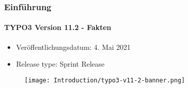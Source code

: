 %

\begin{frame}[fragile]
	\frametitle{Einführung}
	\framesubtitle{TYPO3 Version 11.2 - Fakten}

	\begin{itemize}
		\item Veröffentlichungsdatum: 4. Mai 2021
		\item Release type: Sprint Release
	\end{itemize}

	\begin{figure}
		\texttt{[image: Introduction/typo3-v11-2-banner.png]}
	\end{figure}

\end{frame}

